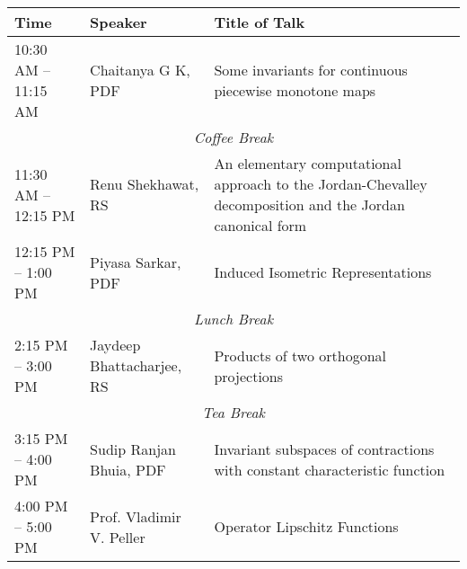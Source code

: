 \noindent
\renewcommand{\arraystretch}{1.5} %
\begin{tabular}{|p{3.5cm}|p{4cm}|p{7cm}|}
	\hline
	\textbf{Time} & \textbf{Speaker} & \textbf{Title of Talk} \\
	\hline
	10:30 AM -- 11:15 AM & Chaitanya G K, PDF & Some invariants for continuous piecewise monotone maps \\
	\hline
	\multicolumn{3}{|c|}{\textit{Coffee Break}} \\
	\hline
	11:30 AM -- 12:15 PM & Renu Shekhawat, RS & An elementary computational approach to the Jordan-Chevalley decomposition and the Jordan canonical form \\
	\hline
	12:15 PM -- 1:00 PM & Piyasa Sarkar, PDF & Induced Isometric Representations \\
	\hline
	\multicolumn{3}{|c|}{\textit{Lunch Break}} \\
	\hline
	2:15 PM -- 3:00 PM & Jaydeep Bhattacharjee, RS& Products of two orthogonal projections\\
	\hline
	\multicolumn{3}{|c|}{\textit{Tea Break}} \\
	\hline

	3:15 PM -- 4:00 PM & Sudip Ranjan Bhuia, PDF & Invariant subspaces of contractions with constant characteristic function \\
	\hline

    4:00 PM -- 5:00 PM & Prof. Vladimir V. Peller & Operator Lipschitz Functions \\
    \hline
\end{tabular}
